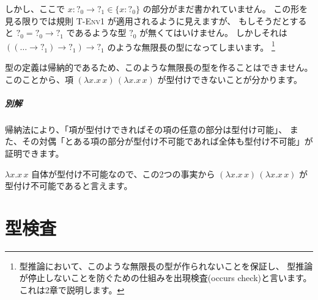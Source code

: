 \begin{exercise}
しかし、ここで $x : ?_0 \to ?_1 \in \{x : ?_0\}$ の部分がまだ書かれていません。
この形を見る限りでは規則 \textsc{T-Env1} が適用されるように見えますが、
もしそうだとすると $?_0 = ?_0 \to ?_1$ であるような型 $?_0$ が無くてはいけません。
しかしそれは $((\dots \to ?_1) \to ?_1) \to ?_1$ のような無限長の型になってしまいます。
\footnote{型推論において、このような無限長の型が作られないことを保証し、
型推論が停止しないことを防ぐための仕組みを出現検査(occurs check)と言います。
これは2章で説明します。}

型の定義は帰納的であるため、このような無限長の型を作ることはできません。
このことから、項 $(\lambda x . x \, x) \, (\lambda x . x \, x)$ が型付けできないことが分かります。

\subparagraph{別解}

帰納法により、「項が型付けできればその項の任意の部分は型付け可能」、
また、その対偶「とある項の部分が型付け不可能であれば全体も型付け不可能」が証明できます。

$\lambda x . x \, x$ 自体が型付け不可能なので、この2つの事実から
$(\lambda x . x \, x) \, (\lambda x . x \, x)$ が型付け不可能であると言えます。

\end{exercise}

\section{型検査}



